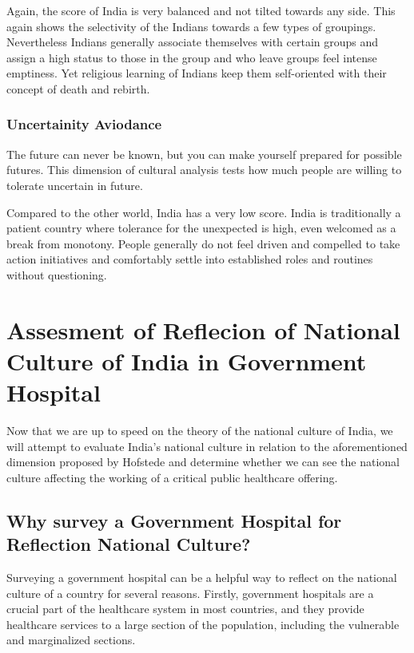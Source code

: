 \documentclass{article}
\begin{document}
Again, the score of India is very balanced and not tilted towards any side. This again shows the selectivity of the Indians towards a few types of groupings. Nevertheless Indians generally associate themselves with certain groups and assign a high status to those in the group and who leave groups feel intense emptiness. Yet religious learning of Indians keep them self-oriented with their concept of death and rebirth.

\subsubsection{Uncertainity Aviodance}

The future can never be known, but you can make yourself prepared for possible futures. This dimension of cultural analysis tests how much people are willing to tolerate uncertain in future.

Compared to the other world, India has a very low score. India is traditionally a patient country where tolerance for the unexpected is high, even welcomed as a break from monotony. People generally do not feel driven and compelled to take action initiatives and comfortably settle into established roles and routines without questioning.

\section{Assesment of Reflecion of National Culture of India in Government Hospital}

Now that we are up to speed on the theory of the national culture of India, we will attempt to evaluate India's national culture in relation to the aforementioned dimension proposed by Hofstede and determine whether we can see the national culture affecting the working of a critical public healthcare offering.

\subsection{Why survey a Government Hospital for Reflection National Culture?}

Surveying a government hospital can be a helpful way to reflect on the national culture of a country for several reasons. Firstly, government hospitals are a crucial part of the healthcare system in most countries, and they provide healthcare services to a large section of the population, including the vulnerable and marginalized sections.
\end{document}
